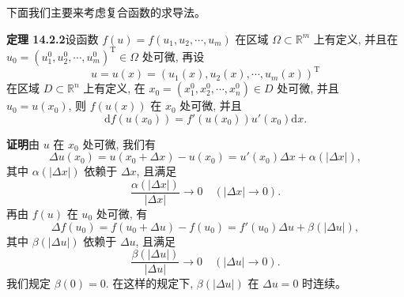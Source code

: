 \documentclass[UTF8, 12pt, fontset=fandol, oneside]{ctexart}
\begin{document}
下面我们主要来考虑复合函数的求导法。

\noindent\textbf{定理 14.2.2}\quad 设函数 $f(u)=f(u_1,u_2,\cdots,u_m)$ 在区域 $\Omega\subset\mathbb R^m$ 上有定义, 并且在 $u_0=(u_1^0,u_2^0,\cdots,u_m^0)^\mathrm T\in\Omega$ 处可微, 再设
\[
  u=u(x)=(u_1(x),u_2(x),\cdots,u_m(x))^\mathrm T
\]
在区域 $D\subset\mathbb R^n$ 上有定义, 在 $x_0=(x_1^0,x_2^0,\cdots,x_n^0)\in D$ 处可微, 并且 $u_0=u(x_0)$, 则 $f(u(x))$ 在 $x_0$ 处可微, 并且
\[
  \mathrm df(u(x_0))=f'(u(x_0))u'(x_0)\mathrm dx.
\]

\noindent\textbf{证明}\quad 由 $u$ 在 $x_0$ 处可微, 我们有
\[
  \Delta u(x_0)=u(x_0+\Delta x)-u(x_0)
  =u'(x_0)\Delta x+\alpha(|\Delta x|),
\]
其中 $\alpha(|\Delta x|)$ 依赖于 $\Delta x$, 且满足
\[
  \frac{\alpha(|\Delta x|)}{|\Delta x|}\to0\quad(|\Delta x|\to0).
\]
再由 $f(u)$ 在 $u_0$ 处可微, 有
\[
  \Delta f(u_0)=f(u_0+\Delta u)-f(u_0)=f'(u_0)\Delta u+\beta(|\Delta u|),
\]
其中 $\beta(|\Delta u|)$ 依赖于 $\Delta u$, 且满足
\[
  \frac{\beta(|\Delta u|)}{|\Delta u|}\to0\quad(|\Delta u|\to0).
\]
我们规定 $\beta(0)=0$. 在这样的规定下, $\beta(|\Delta u|)$ 在 $\Delta u=0$ 时连续。
\end{document}
